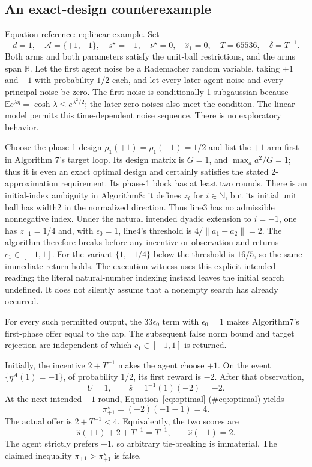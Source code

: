 \documentclass[10pt]{article}
\begin{document}
\subsection*{An exact-design counterexample}
Equation reference: eq:linear-example. Set \[
 d=1,\quad \mathcal A=\{+1,-1\},\quad
 s^\star=-1,\quad \nu^\star=0,\quad
 \widehat s_1=0,\quad T=65536,\quad \delta=T^{-1}.\] Both arms and both parameters satisfy the unit-ball restrictions, and the arms span \(\mathbb R\). Let the first agent noise be a Rademacher random variable, taking \(+1\) and \(-1\) with probability \(1/2\) each, and let every later agent noise and every principal noise be zero. The first noise is conditionally 1-subgaussian because \(\mathbb E e^{\lambda\eta}=\cosh\lambda\leq e^{\lambda^2/2}\); the later zero noises also meet the condition. The linear model permits this time-dependent noise sequence. There is no exploratory behavior.\par
Choose the phase-1 design \(\rho_1(+1)=\rho_1(-1)=1/2\) and list the \(+1\) arm first in Algorithm 7’s target loop. Its design matrix is \(G=1\), and \(\max_a a^2/G=1\); thus it is even an exact optimal design and certainly satisfies the stated 2-approximation requirement. Its phase-1 block has at least two rounds. There is an initial-index ambiguity in Algorithm8: it defines \(z_i\) for \(i\in\mathbb N\), but its initial unit ball has width2 in the normalized direction. Thus line3 has no admissible nonnegative index. Under the natural intended dyadic extension to \(i=-1\), one has \(z_{-1}=1/4\) and, with \(\epsilon_0=1\), line4’s threshold is \(4/\|a_1-a_2\|=2\). The algorithm therefore breaks before any incentive or observation and returns \(c_1\in[-1,1]\). For the variant \(\{1,-1/4\}\) below the threshold is \(16/5\), so the same immediate return holds. The execution witness uses this explicit intended reading; the literal natural-number indexing instead leaves the initial search undefined. It does not silently assume that a nonempty search has already occurred.\par
For every such permitted output, the \(33\epsilon_0\) term with \(\epsilon_0=1\) makes Algorithm7’s first-phase offer equal to the cap. The subsequent false norm bound and target rejection are independent of which \(c_1\in[-1,1]\) is returned.\par
Initially, the incentive \(2+T^{-1}\) makes the agent choose \(+1\). On the event \(\{\eta^A(1)=-1\}\), of probability \(1/2\), its first reward is \(-2\). After that observation, \[U=1,\qquad \widehat s=1^{-1}(1)(-2)=-2.\] At the next intended \(+1\) round, Equation [eq:optimal] (\#eq:optimal) yields \[\pi^\star_{+1}=(-2)(-1-1)=4.\] The actual offer is \(2+T^{-1}<4\). Equivalently, the two scores are \[\widehat s(+1)+2+T^{-1}=T^{-1},
 \qquad \widehat s(-1)=2.\] The agent strictly prefers \(-1\), so arbitrary tie-breaking is immaterial. The claimed inequality \(\pi_{+1}>\pi^\star_{+1}\) is false.\par
\end{document}
